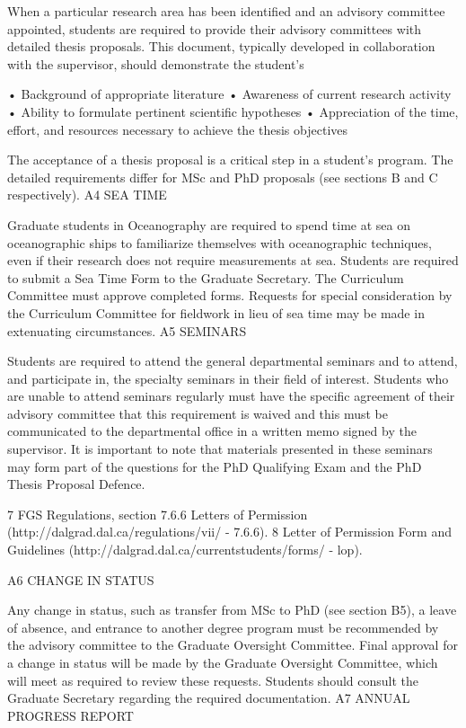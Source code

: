 When a particular research area has been identified and an advisory committee appointed, students are required to provide their advisory committees with detailed thesis proposals. This document, typically developed in collaboration with the supervisor, should demonstrate the student's

•	Background of appropriate literature
•	Awareness of current research activity
•	Ability to formulate pertinent scientific hypotheses
•	Appreciation of the time, effort, and resources necessary to achieve the thesis objectives

The acceptance of a thesis proposal is a critical step in a student's program. The detailed requirements differ for MSc and PhD proposals (see sections B and C respectively).
A4	SEA TIME

Graduate students in Oceanography are required to spend time at sea on oceanographic ships to familiarize themselves with oceanographic techniques, even if their research does not require measurements at sea. Students are required to submit a Sea Time Form to the Graduate Secretary. The Curriculum Committee must approve completed forms. Requests for special consideration by the Curriculum Committee for fieldwork in lieu of sea time may be made in extenuating circumstances.
A5	SEMINARS

Students are required to attend the general departmental seminars and to attend, and participate in, the specialty seminars in their field of interest. Students who are unable to attend seminars regularly must have the specific agreement of their advisory committee that this requirement is waived and this must be communicated to the departmental office in a written memo signed by the supervisor. It is important to note that materials presented in these seminars may form part of the questions for the PhD Qualifying Exam and the PhD Thesis Proposal Defence.



7 FGS Regulations, section 7.6.6 Letters of Permission (http://dalgrad.dal.ca/regulations/vii/ - 7.6.6).
8 Letter of Permission Form and Guidelines (http://dalgrad.dal.ca/currentstudents/forms/ - lop).
 

A6	CHANGE IN STATUS

Any change in status, such as transfer from MSc to PhD (see section B5), a leave of absence, and entrance to another degree program must be recommended by the advisory committee to the Graduate Oversight Committee. Final approval for a change in status will be made by the Graduate Oversight Committee, which will meet as required to review these requests. Students should consult the Graduate Secretary regarding the required documentation.
A7	ANNUAL PROGRESS REPORT

